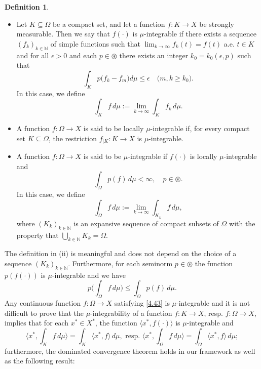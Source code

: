 \documentclass{amsart}
\theoremstyle{definition}
\newtheorem{defn}[thm]{Definition}
\theoremstyle{remark}
\numberwithin{equation}{section}
\begin{document}
\begin{defn}\label{Kint}
\begin{itemize}
\item[(i)] Let $K\subseteq\Omega$ be a compact set, and let a function $f\colon K\to X$ be strongly measurable.
Then we say that $f(\cdot)$ is $\mu$-integrable if there exists a sequence $(f_k)_{k\in\mathbb N}$ of simple functions such that $\lim_{k\to\infty}f_k(t)=f(t)$ a.e. $t\in K$ and for all $\epsilon>0$ and each $p\in\circledast$ there exists an integer  $k_0=k_0(\epsilon,p)$ such that
\begin{equation*}
\int_Kp\bigl(f_k-f_m\bigr)d\mu\leq\epsilon\quad \bigl(m,k\geq k_0\bigr).
\end{equation*}
In this case, we define
\[
\int_Kf\,d\mu:=\lim_{k\to\infty}\int_Kf_k\, d\mu.
\]
\item[(ii)] A function $f\colon\Omega\to X$ is said to be locally $\mu$-integrable if, for every compact set $K\subseteq\Omega$, the restriction $f_{|K}\colon K\to X$ is $\mu$-integrable.
\item[(iii)] A function $f\colon\Omega\to X$ is said to be $\mu$-integrable if $f(\cdot)$ is locally $\mu$-integrable and
\begin{equation}\label{4.43}
\int_{\Omega}p(f)\, d\mu<\infty,\quad p\in\circledast.
\end{equation}
In this case, we define
\[
\int_{\Omega}f\,d\mu:=\lim_{k\to\infty}\int_{K_k}f\,d\mu,
\]
where $(K_k)_{k\in\mathbb N}$ is an expansive sequence of compact subsets of $\Omega$ with the property that $\bigcup_{k\in\mathbb N}K_k=\Omega$.
\end{itemize}
\end{defn}

The definition in (ii) is meaningful and does not depend on the choice of a sequence $(K_k)_{k\in\mathbb N}$.
Furthermore, for each seminorm $p\in\circledast$ the function $p(f(\cdot))$ is $\mu$-integrable and we have 
\begin{equation}\label{blue-note-0}
p\bigg(\int_{\Omega}f\,d\mu\bigg)\leq\int_{\Omega}p(f)\, d\mu.
\end{equation}
Any continuous function $f\colon\Omega\to X$ satisfying \eqref{4.43} is $\mu$-integrable and it is not difficult to prove that
the $\mu$-integrability of a function $f\colon K\to X$, resp. $f\colon\Omega\to X $, implies that for each $x^*\in X^*$, the function $\langle x^*,f(\cdot)\rangle$ is $\mu$-integrable and
\begin{equation}\label{sex-pistols}
\bigg\langle x^*,\int_Kf\,d\mu\bigg\rangle=\int_K \bigl \langle x^*,f\bigr \rangle \, d\mu,\text{ resp. }\bigg\langle x^*,\int_{\Omega}f\,d\mu\bigg\rangle=\int_{\Omega}\bigl \langle x^*,f\bigr \rangle \, d\mu;
\end{equation}
furthermore, the dominated convergence theorem holds in our framework as well as the following result:
\end{document}
